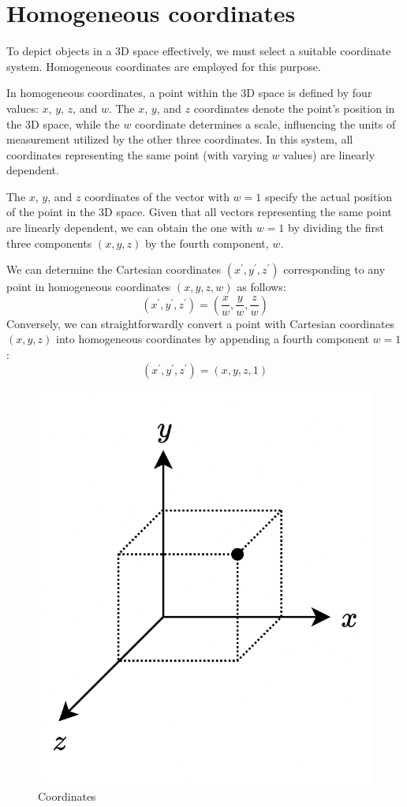\section{Homogeneous coordinates}

To depict objects in a 3D space effectively, we must select a suitable coordinate system. Homogeneous coordinates are employed for this purpose.

In homogeneous coordinates, a point within the 3D space is defined by four values: $x$, $y$, $z$, and $w$. 
The $x$, $y$, and $z$ coordinates denote the point's position in the 3D space, while the $w$ coordinate determines a scale, influencing the units of measurement utilized by the other three coordinates.
In this system, all coordinates representing the same point (with varying $w$ values) are linearly dependent.

The $x$, $y$, and $z$ coordinates of the vector with $w = 1$ specify the actual position of the point in the 3D space. 
Given that all vectors representing the same point are linearly dependent, we can obtain the one with $w = 1$ by dividing the first three components $(x, y, z)$ by the fourth component, $w$.

We can determine the Cartesian coordinates $(x^\prime,y^\prime,z^\prime)$ corresponding to any point in homogeneous coordinates $(x,y,z,w)$ as follows:
\[(x^\prime,y^\prime,z^\prime)=\left( \dfrac{x}{w},\dfrac{y}{w},\dfrac{z}{w} \right)\]
Conversely, we can straightforwardly convert a point with Cartesian coordinates $(x,y,z)$ into homogeneous coordinates by appending a fourth component $w=1$:
\[(x^\prime,y^\prime,z^\prime)=(x,y,z,1)\]

\begin{figure}[H]
    \centering
    \includegraphics[width=0.23\linewidth]{images/homogeneous.png}
    \caption{Coordinates}
\end{figure}